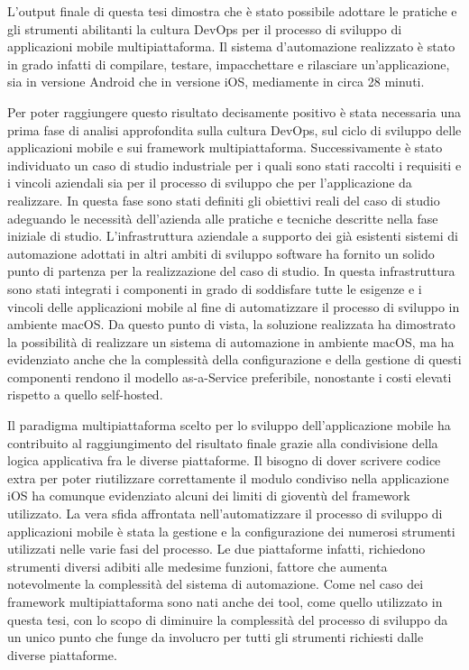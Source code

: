 
L'output finale di questa tesi dimostra che è stato possibile adottare le pratiche e gli strumenti abilitanti la cultura DevOps per il processo di sviluppo di applicazioni mobile multipiattaforma. 
Il sistema d'automazione realizzato è stato in grado infatti di compilare, 
testare, 
impacchettare e rilasciare un'applicazione, 
sia in versione Android che in versione iOS,
mediamente in circa 28 minuti.

Per poter raggiungere questo risultato decisamente positivo è stata necessaria una prima fase di analisi approfondita sulla cultura DevOps, sul ciclo di sviluppo delle applicazioni mobile e sui framework multipiattaforma. Successivamente è stato individuato un caso di studio industriale per i quali sono stati raccolti i requisiti e i vincoli aziendali sia per il processo di sviluppo che per l'applicazione da realizzare. In questa fase sono stati definiti gli obiettivi reali del caso di studio adeguando le necessità dell'azienda alle pratiche e tecniche descritte nella fase iniziale di studio. L'infrastruttura aziendale a supporto dei già esistenti sistemi di automazione adottati in altri ambiti di sviluppo software ha fornito un solido punto di partenza per la realizzazione del caso di studio. In questa infrastruttura sono stati integrati i componenti in grado di soddisfare tutte le esigenze e i vincoli delle applicazioni mobile al fine di automatizzare il processo di sviluppo in ambiente macOS.
Da questo punto di vista,
la soluzione realizzata ha dimostrato la possibilità di realizzare un sistema di automazione in ambiente macOS,
ma ha evidenziato anche che la complessità della configurazione
e della gestione di questi componenti
rendono il modello as-a-Service preferibile,
nonostante i costi elevati rispetto a quello self-hosted.

Il paradigma multipiattaforma scelto per lo sviluppo dell'applicazione mobile
ha contribuito al raggiungimento del risultato finale
grazie alla condivisione della logica applicativa fra le diverse piattaforme.
%
Il bisogno di dover scrivere codice extra
per poter riutilizzare correttamente il modulo condiviso nella applicazione iOS
ha comunque evidenziato alcuni dei limiti di gioventù del framework utilizzato.
%
La vera sfida affrontata nell'automatizzare il processo di sviluppo di applicazioni mobile
è stata la gestione e la configurazione dei numerosi strumenti utilizzati nelle varie fasi del processo.
%
Le due piattaforme infatti,
richiedono strumenti diversi adibiti alle medesime funzioni,
fattore che aumenta notevolmente la complessità del sistema di automazione.
%
Come nel caso dei framework multipiattaforma sono nati anche dei tool,
come quello utilizzato in questa tesi,
con lo scopo di diminuire la complessità del processo di sviluppo da un unico punto che funge da involucro per tutti gli strumenti richiesti dalle diverse piattaforme.